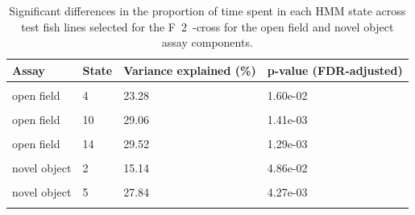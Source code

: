 \documentclass[
]{book}
\begin{document}
\begin{table}

\caption{\label{tab:mikk-dge-F0}Significant differences in the proportion of time spent in each HMM state across test fish lines selected for the F~2~-cross for the open field and novel object assay components.}
\centering
\begin{tabular}[t]{llll}
\toprule
Assay & State & Variance explained (\%) & p-value (FDR-adjusted)\\
\midrule
\cellcolor{gray!6}{open field} & \cellcolor{gray!6}{3} & \cellcolor{gray!6}{21.53} & \cellcolor{gray!6}{2.67e-03}\\
open field & 4 & 23.28 & 1.60e-02\\
\cellcolor{gray!6}{open field} & \cellcolor{gray!6}{5} & \cellcolor{gray!6}{20.61} & \cellcolor{gray!6}{3.15e-02}\\
open field & 10 & 29.06 & 1.41e-03\\
\cellcolor{gray!6}{open field} & \cellcolor{gray!6}{12} & \cellcolor{gray!6}{24.91} & \cellcolor{gray!6}{1.45e-02}\\
\addlinespace
open field & 14 & 29.52 & 1.29e-03\\
\cellcolor{gray!6}{novel object} & \cellcolor{gray!6}{1} & \cellcolor{gray!6}{16.21} & \cellcolor{gray!6}{1.90e-02}\\
novel object & 2 & 15.14 & 4.86e-02\\
\cellcolor{gray!6}{novel object} & \cellcolor{gray!6}{4} & \cellcolor{gray!6}{26.90} & \cellcolor{gray!6}{5.21e-03}\\
novel object & 5 & 27.84 & 4.27e-03\\
\addlinespace
\cellcolor{gray!6}{novel object} & \cellcolor{gray!6}{10} & \cellcolor{gray!6}{23.73} & \cellcolor{gray!6}{2.81e-02}\\
\bottomrule
\end{tabular}
\end{table}
\end{document}
